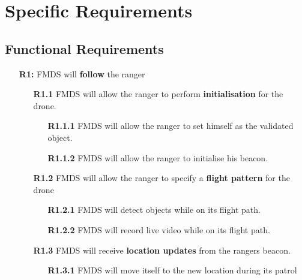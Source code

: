 \chapter{Specific Requirements}

\section{Functional Requirements}
\begin{flushleft}
\begin{itemize}
	\item  [\textbf{R1:}] FMDS will \textbf{follow} the ranger

		\begin{itemize}
			\item  [\textbf{R1.1}] FMDS will allow the ranger to perform \textbf{initialisation} for the drone.
				\begin{itemize}
					\item [\textbf{R1.1.1}] FMDS will allow the ranger to set himself as the validated object.
					\item [\textbf{R1.1.2}] FMDS will allow the ranger to initialise his beacon. 
				\end{itemize}

			\item  [\textbf{R1.2}] FMDS will allow the ranger to specify a \textbf{flight pattern} for the drone
				\begin{itemize}
					\item [\textbf{R1.2.1}] FMDS will detect objects while on its flight path.
					\item [\textbf{R1.2.2}] FMDS will record live video while on its flight path.
				\end{itemize}

			\item  [\textbf{R1.3}] FMDS will receive \textbf{location updates} from the rangers beacon.
				\begin{itemize}
					\item  [\textbf{R1.3.1}] FMDS will move itself to the new location during its patrol
				\end{itemize}
		\end{itemize}
\end{itemize}


\end{flushleft}
